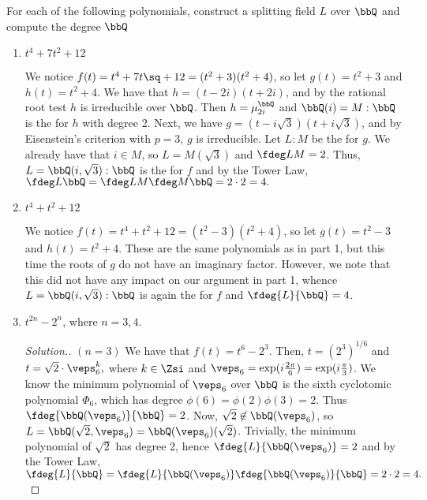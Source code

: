 \documentclass{article}
\begin{document}
\setcounter{section}{4}
\begin{exercise}
  For each of the following polynomials, construct a splitting field $ L $ over $ \bbQ $ and compute the degree $ \index{L}{\bbQ} $
\end{exercise}

\begin{enumerate}
\item $ t^4+7t^2+12 $
\begin{solution}
  We notice $ f(t) = t^4+7t\sq+12 = (t^2+3)(t^2+4) $, so let $ g(t) = t^2+3 $ and $ h(t) = t^2+4 $.
  We have that $ h=(t-2i)(t+2i) $, and by the rational root test $ h $ is irreducible over $ \bbQ $.
  Then $ h = \mu_{2i}^\bbQ $ and $ \bbQ(i)=M:\bbQ $ is the \sfe for $ h $ with degree 2.
  Next, we have $ g = (t-i\sqrt 3)(t+i\sqrt 3) $, and by Eisenstein's criterion with $ p=3 $, $ g $ is irreducible.
  Let $ L:M $ be the \sfe for $ g $.
  We already have that $ i\in M $, so $ L=M(\sqrt 3) $ and $ \fdeg L M = 2 $.
  Thus, $ L=\bbQ(i,\sqrt 3):\bbQ $ is the \sfe for $ f $ and by the Tower Law, $ \fdeg L \bbQ = \fdeg L M \fdeg M \bbQ = 2\cdot 2 = 4. $
\end{solution}

\item $ t^4+t^2+12 $
\begin{solution}
  We notice $ f(t) = t^4+t^2+12 = (t^2-3)(t^2+4) $, so let $ g(t) = t^2-3 $ and $ h(t) = t^2+4 $.
  These are the same polynomials as in part 1, but this time the roots of $ g $ do not have an imaginary factor.
  However, we note that this did not have any impact on our argument in part 1, whence $ L = \bbQ(i,\sqrt 3):\bbQ $ is again the \sfe for $ f $ and $ \fdeg{L}{\bbQ} = 4 $.
\end{solution}

\item $ t^{2n}-2^n $, where $ n=3,4 $.

\begin{proof}[Solution.] $ (n=3) $
  We have that $ f(t) = t^6 - 2^3 $.
  Then, $ t = (2^3)^{1/6} $ and $t = \sqrt{2}\cdot \veps_6^k, $ where $ k\in\Zsi $ and $ \veps_6=\exp(i\frac{2\pi}{6})=\exp(i\frac{\pi}{3}) $.
    We know the minimum polynomial of $ \veps_6 $ over $ \bbQ $ is the sixth cyclotomic polynomial $ \Phi_6 $, which has degree $ \phi(6) = \phi(2)\phi(3) = 2 $.
  Thus $ \fdeg{\bbQ(\veps_6)}{\bbQ} = 2 $.
  Now, $ \sqrt 2\not\in \bbQ(\veps_6) $, so $ L=\bbQ(\sqrt 2, \veps_6)=\bbQ(\veps_6)(\sqrt 2) $.
  Trivially, the minimum polynomial of $ \sqrt 2 $ has degree 2, hence $ \fdeg{L}{\bbQ(\veps_6)} = 2 $ and by the Tower Law, $ \fdeg{L}{\bbQ}=\fdeg{L}{\bbQ(\veps_6)}\fdeg{\bbQ(\veps_6)}{\bbQ} = 2\cdot 2 = 4. $


\end{proof}
\end{enumerate}
\end{document}
